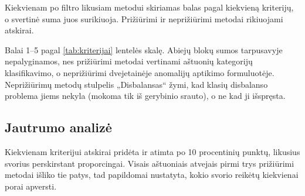 Kiekvienam po filtro likusiam metodui skiriamas balas pagal kiekvieną
kriterijų, o svertinė suma juos surikiuoja. Prižiūrimi ir neprižiūrimi
metodai rikiuojami atskirai.

%

\begin{table}[H]
\centering
\caption{Sprendimų matrica: po filtro likę metodai pagal
         \ref{tab:kriterijai} lentelės kriterijus ir svorius}
\label{tab:matrica}

\vspace{2pt}
\raggedright\footnotesize
Balai 1--5 pagal \ref{tab:kriterijai} lentelės skalę.
Abiejų blokų sumos tarpusavyje nepalyginamos, nes prižiūrimi metodai
vertinami aštuonių kategorijų klasifikavimo, o neprižiūrimi dvejetainėje
anomalijų aptikimo formuluotėje.
Neprižiūrimų metodų stulpelis „Disbalansas“ žymi, kad klasių disbalanso
problema jiems nekyla (mokoma tik iš gerybinio srauto), o ne kad
ji išspręsta.
\normalsize
\end{table}

\subsection{Jautrumo analizė}
\label{sec:jautrumas}


Kiekvienam kriterijui atskirai pridėta ir atimta po 10 procentinių
punktų, likusius svorius perskirstant proporcingai. Visais aštuoniais
atvejais pirmi trys prižiūrimi metodai išliko tie patys, tad papildomai
nustatyta, kokio svorio reikėtų kiekvienai porai apversti.

